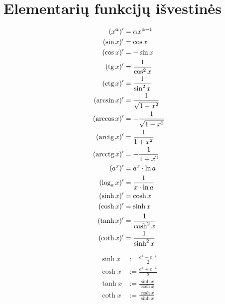 \section{Elementarių funkcijų išvestinės}

\label{dx_formulynas}

\begin{align}
%
  (x^{\alpha})' &= \alpha x^{\alpha - 1}
  \label{dx_laipsnine} \\
%
  (\sin x)' &= \cos x
  \label{dx_sin} \\
%
  (\cos x)' &= - \sin x
  \label{dx_cos} \\
%
  (\tg x)' &= \frac{1}{\cos^{2} x}
  \label{dx_tg} \\
%
  (\ctg x)' &= \frac{1}{\sin^{2} x}
  \label{dx_ctg} \\
%
  (\arcsin x)' &= \frac{1}{\sqrt{1 - x^{2}}}
  \label{dx_arcsin} \\
%
  (\arccos x)' &= - \frac{1}{\sqrt{1 - x^{2}}}
  \label{dx_arccos} \\
%
  (\arctg x)' &= \frac{1}{1 + x^{2}}
  \label{dx_arctg} \\
%
  (\arcctg x)' &= - \frac{1}{1 + x^{2}}
  \label{dx_arcctg} \\
%
  (a^{x})' &= a^{x} \cdot \ln a
  \label{dx_expo} \\
%
  (\log _{a} x)' &= \frac{1}{x \cdot \ln a}
  \label{dx_log} \\
%
  (\sinh x)' &= \cosh x
  \label{dx_sh} \\
%
  (\cosh x)' &= \sinh x
  \label{dx_ch} \\
% 
  (\tanh x)' &= \frac{1}{\cosh^{2} x}
  \label{dx_th} \\
%
  (\coth x)' &= \frac{1}{\sinh^{2} x}
  \label{dx_cth}
\end{align}

\begin{note}
  \begin{align*}
    \sinh x &:= \frac{e^{x} - e^{-x}}{2} \\
    \cosh x &:= \frac{e^{x} + e^{-x}}{2} \\
    \tanh x &:= \frac{\sinh x}{\cosh x} \\
    \coth x &:= \frac{\cosh x}{\sinh x}
  \end{align*}
\end{note}

